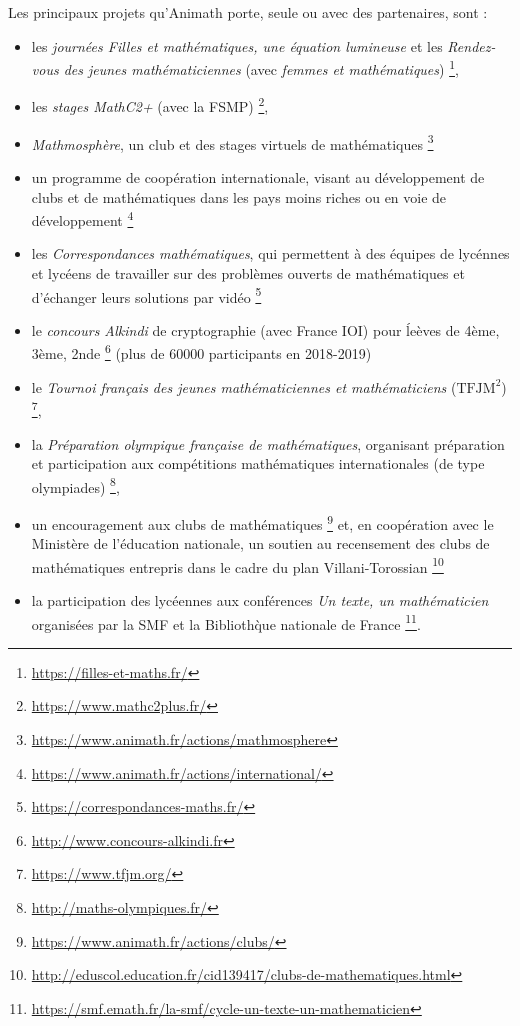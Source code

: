 Les principaux projets qu'Animath porte, seule ou avec des partenaires, sont : 
\begin{itemize} 
\item les {\it journ\'ees Filles et math\'ematiques, 
une \'equation lumineuse} et les {\it Rendez-vous des jeunes math\'ematiciennes} (avec {\it femmes et math\'ematiques}) 
\footnote{\url{https://filles-et-maths.fr/}}, 
\item les {\it stages MathC2+} (avec la FSMP)
\footnote{\url{https://www.mathc2plus.fr/}},
\item {\it Mathmosph\`ere}, un club et des stages virtuels de math\'ematiques \footnote{\url{https://www.animath.fr/actions/mathmosphere}}
\item un programme de coop\'eration internationale, visant au d\'eveloppement de clubs et de math\'ematiques dans les pays moins riches ou en voie de d\'eveloppement
\footnote{\url{https://www.animath.fr/actions/international/}}
\item les {\it Correspondances math\'ematiques}, qui permettent \`a des \'equipes de lyc\'ennes et lyc\'eens de travailler sur des probl\`emes ouverts de math\'ematiques et d'\'echanger leurs solutions par vid\'eo \footnote{\url{https://correspondances-maths.fr/}} 
\item le {\it concours Alkindi} de cryptographie (avec France IOI) pour \'le\`eves de 4\`eme, 3\`eme, 2nde 
\footnote{\url{http://www.concours-alkindi.fr}} (plus de 60000 participants en 2018-2019)
\item le {\it Tournoi français des jeunes math\'ematiciennes et math\'ematiciens} ($\text{TFJM}^2$) 
\footnote{\url{https://www.tfjm.org/}}, 
\item la {\it Pr\'eparation olympique fran\c caise de math\'ematiques}, organisant pr\'eparation et participation aux comp\'etitions math\'ematiques internationales (de type olympiades)
\footnote{\url{http://maths-olympiques.fr/}}, 
\item un encouragement aux clubs de math\'ematiques \footnote{\url{https://www.animath.fr/actions/clubs/}} et, en coop\'eration avec le Minist\`ere de l'\'education nationale, un soutien au recensement des clubs de math\'ematiques entrepris dans le cadre du plan Villani-Torossian
\footnote{\url{http://eduscol.education.fr/cid139417/clubs-de-mathematiques.html}}
\item la participation des lyc\'een\mp nes aux conf\'erences {\it Un texte, un math\'ematicien} organis\'ees par la SMF et la Biblioth\`que nationale de France \footnote{\url{https://smf.emath.fr/la-smf/cycle-un-texte-un-mathematicien}}. 
\end{itemize}

